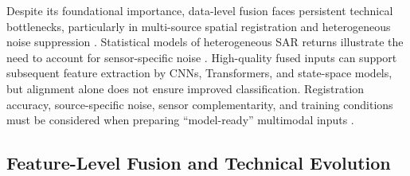 \documentclass[]{interact}
\theoremstyle{plain}%
\theoremstyle{definition}
\theoremstyle{remark}
\begin{document}
Despite its foundational importance, data-level fusion faces persistent technical bottlenecks, particularly in multi-source spatial registration and heterogeneous noise suppression \citep{41}. Statistical models of heterogeneous SAR returns illustrate the need to account for sensor-specific noise \citep{58}. High-quality fused inputs can support subsequent feature extraction by CNNs, Transformers, and state-space models, but alignment alone does not ensure improved classification. Registration accuracy, source-specific noise, sensor complementarity, and training conditions must be considered when preparing ``model-ready'' multimodal inputs \citep{23,cao2020urban}.


\clearpage
\subsection{Feature-Level Fusion and Technical Evolution}
\end{document}
